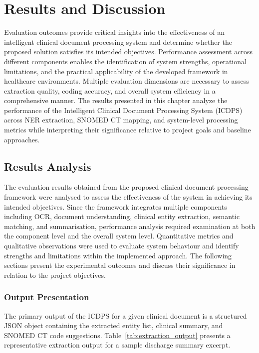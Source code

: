 \chapter{Results and Discussion}

Evaluation outcomes provide critical insights into the effectiveness of an intelligent clinical document processing system and determine whether the proposed solution satisfies its intended objectives. Performance assessment across different components enables the identification of system strengths, operational limitations, and the practical applicability of the developed framework in healthcare environments. Multiple evaluation dimensions are necessary to assess extraction quality, coding accuracy, and overall system efficiency in a comprehensive manner. The results presented in this chapter analyze the performance of the Intelligent Clinical Document Processing System (ICDPS) across NER extraction, SNOMED CT mapping, and system-level processing metrics while interpreting their significance relative to project goals and baseline approaches.

\section{Results Analysis}

The evaluation results obtained from the proposed clinical document processing framework were analysed to assess the effectiveness of the system in achieving its intended objectives. Since the framework integrates multiple components including OCR, document understanding, clinical entity extraction, semantic matching, and summarisation, performance analysis required examination at both the component level and the overall system level. Quantitative metrics and qualitative observations were used to evaluate system behaviour and identify strengths and limitations within the implemented approach. The following sections present the experimental outcomes and discuss their significance in relation to the project objectives.

\subsection{Output Presentation}
The primary output of the ICDPS for a given clinical document is a structured JSON object containing the extracted entity list, clinical summary, and SNOMED CT code suggestions. Table~\ref{tab:extraction_output} presents a representative extraction output for a sample discharge summary excerpt.

